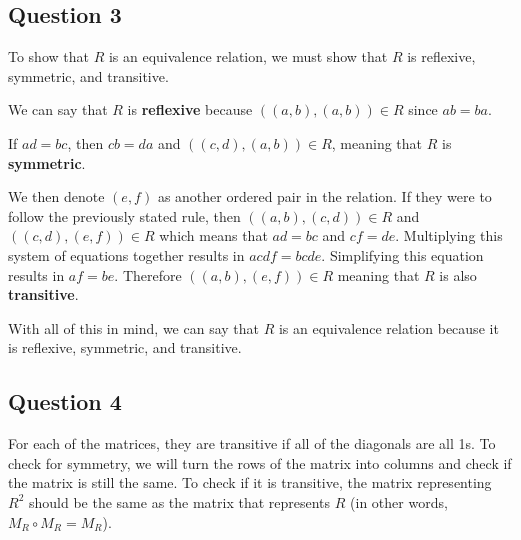 \documentclass[letterpaper, 12pt]{article}
\begin{document}
\subsection*{Question 3}
To show that $R$ is an equivalence relation, we must show that $R$ is reflexive, symmetric, and transitive.

We can say that $R$ is \textbf{reflexive} because $((a,b), (a,b)) \in R$ since $ab = ba$. 

If $ad = bc$, then $cb = da$ and $((c,d), (a,b)) \in R$, meaning that $R$ is \textbf{symmetric}.

We then denote $(e,f)$ as another ordered pair in the relation. If they were to follow the previously stated rule, then $((a,b), (c,d)) \in R$ and $((c,d), (e,f)) \in R$ which means that $ad = bc$ and $cf = de$. Multiplying this system of equations together results in $acdf = bcde$. Simplifying this equation results in $af = be$. Therefore $((a,b), (e,f)) \in R$ meaning that $R$ is also \textbf{transitive}.

With all of this in mind, we can say that $R$ is an equivalence relation because it is reflexive, symmetric, and transitive.

\subsection*{Question 4}
For each of the matrices, they are transitive if all of the diagonals are all 1s. To check for symmetry, we will turn the rows of the matrix into columns and check if the matrix is still the same. To check if it is transitive, the matrix representing $R^2$ should be the same as the matrix that represents $R$ (in other words, $M_R \circ M_R = M_R$).
\end{document}
